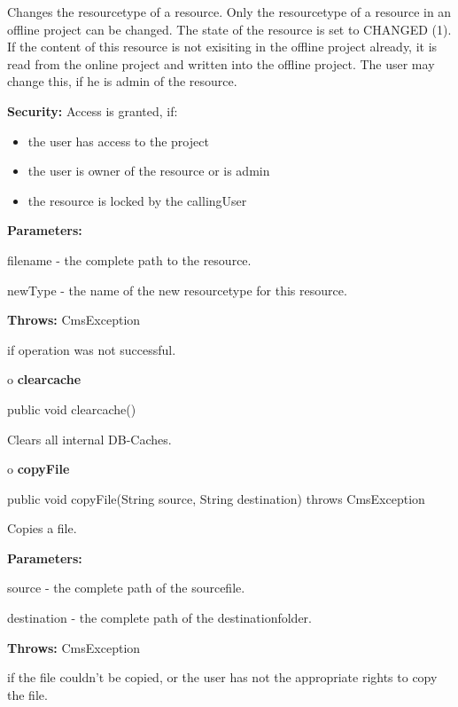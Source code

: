 \begin{description}
\htmlDD Changes the resourcetype of a resource. \htmlBR
Only the resourcetype of a resource in an offline project can be changed. The
state of the resource is set to CHANGED (1). If the content of this resource
is not exisiting in the offline project already, it is read from the online
project and written into the offline project. The user may change this, if he
is admin of the resource. 

{\bf Security:} Access is granted, if: 

\begin{itemize}
\item the user has access to the project 
\item the user is owner of the resource or is admin 
\item the resource is locked by the callingUser 
\end{itemize}

\begin{description}
\item {\bf Parameters:}  

filename - the complete path to the resource.  

newType - the name of the new resourcetype for this resource.  
\item {\bf Throws:} CmsException  

if operation was not successful.  
\end{description}

\end{description}

o {\bf clearcache} 

\begin{PRE}
 public void clearcache()
\end{PRE}

\begin{description}
\htmlDD Clears all internal DB-Caches. 

\end{description}

o {\bf copyFile} 

\begin{PRE}
 public void copyFile(String source,
                      String destination) throws CmsException
\end{PRE}

\begin{description}
\htmlDD Copies a file. 

\begin{description}
\item {\bf Parameters:}  

source - the complete path of the sourcefile.  

destination - the complete path of the destinationfolder.  
\item {\bf Throws:} CmsException  

if the file couldn't be copied, or the user has not the appropriate rights to
copy the file.  
\end{description}

\end{description}

